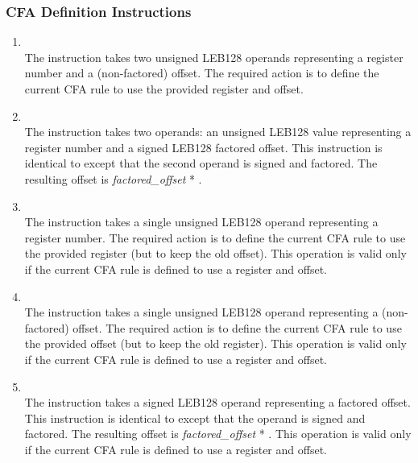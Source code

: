 \subsubsection{CFA Definition Instructions}
\label{chap:cfadefinitioninstructions}
\begin{enumerate}[1. ]

\item \textbf{\DWCFAdefcfaTARG} \\
The \DWCFAdefcfaNAME{}
instruction takes two unsigned LEB128
operands representing a register number and a (non-factored)
offset. The required action is to define the current CFA rule
to use the provided register and offset.

\item \textbf{\DWCFAdefcfasfTARG} \\
The \DWCFAdefcfasfNAME{} instruction takes two operands:
an unsigned LEB128 value
representing a register number and a
signed LEB128 factored offset. This instruction is identical
to \DWCFAdefcfa{} except that the second operand is signed
and factored. The resulting offset is \textit{factored\_offset} *
.


\item \textbf{\DWCFAdefcfaregisterTARG} \\
The \DWCFAdefcfaregisterNAME{} 
instruction takes a single
unsigned LEB128 operand representing a register number. The
required action is to define the current CFA rule to use
the provided register (but to keep the old offset). This
operation is valid only if the current CFA rule is defined
to use a register and offset.


\item \textbf{\DWCFAdefcfaoffsetTARG} \\
The \DWCFAdefcfaoffsetNAME{} instruction takes a single
unsigned LEB128 operand representing a (non-factored)
offset. The required action is to define the current CFA rule
to use the provided offset (but to keep the old register). This
operation is valid only if the current CFA rule is defined
to use a register and offset.

\item \textbf{\DWCFAdefcfaoffsetsfTARG} \\
The \DWCFAdefcfaoffsetsfNAME{} instruction takes a signed
LEB128 operand representing a factored offset. This instruction
is identical to \DWCFAdefcfaoffset{} except that the
operand is signed and factored. The resulting offset is
\textit{factored\_offset} * .
This operation
is valid only if the current CFA rule is defined to use a
register and offset.


\end{enumerate}

